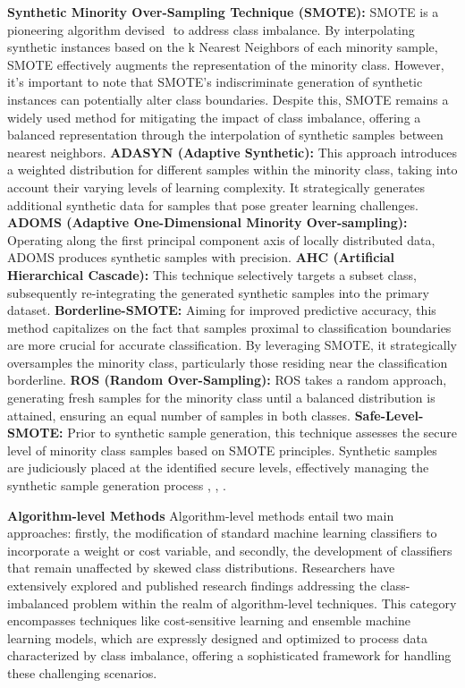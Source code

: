 \textbf{Synthetic Minority Over-Sampling Technique (SMOTE):} SMOTE is a pioneering algorithm devised \cite{Chawla2002}⁠ to address class imbalance. By interpolating synthetic instances based on the k Nearest Neighbors of each minority sample, SMOTE effectively augments the representation of the minority class. However, it's important to note that SMOTE's indiscriminate generation of synthetic instances can potentially alter class boundaries. Despite this, SMOTE remains a widely used method for mitigating the impact of class imbalance, offering a balanced representation through the interpolation of synthetic samples between nearest neighbors.
\textbf{ADASYN (Adaptive Synthetic):} This approach introduces a weighted distribution for different samples within the minority class, taking into account their varying levels of learning complexity. It strategically generates additional synthetic data for samples that pose greater learning challenges.
\textbf{ADOMS (Adaptive One-Dimensional Minority Over-sampling):} Operating along the first principal component axis of locally distributed data, ADOMS produces synthetic samples with precision.
\textbf{AHC (Artificial Hierarchical Cascade):} This technique selectively targets a subset class, subsequently re-integrating the generated synthetic samples into the primary dataset.
\textbf{Borderline-SMOTE:} Aiming for improved predictive accuracy, this method capitalizes on the fact that samples proximal to classification boundaries are more crucial for accurate classification. By leveraging SMOTE, it strategically oversamples the minority class, particularly those residing near the classification borderline.
\textbf{ROS (Random Over-Sampling):} ROS takes a random approach, generating fresh samples for the minority class until a balanced distribution is attained, ensuring an equal number of samples in both classes.
\textbf{Safe-Level-SMOTE:} Prior to synthetic sample generation, this technique assesses the secure level of minority class samples based on SMOTE principles. Synthetic samples are judiciously placed at the identified secure levels, effectively managing the synthetic sample generation process \cite{Tarawneh2020}, \cite{Fotouhi2019}, \cite{Khushi2021}⁠. 

\textbf{Algorithm-level Methods} 
Algorithm-level methods entail two main approaches: firstly, the modification of standard machine learning classifiers to incorporate a weight or cost variable, and secondly, the development of classifiers that remain unaffected by skewed class distributions. Researchers have extensively explored and published research findings addressing the class-imbalanced problem within the realm of algorithm-level techniques. This category encompasses techniques like cost-sensitive learning and ensemble machine learning models, which are expressly designed and optimized to process data characterized by class imbalance, offering a sophisticated framework for handling these challenging scenarios.

